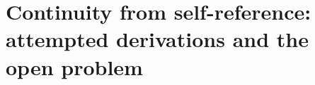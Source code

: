 %   
%
%

\section{Continuity from self-reference: attempted derivations and the open problem}
\label{app:continuity-self-reference}

